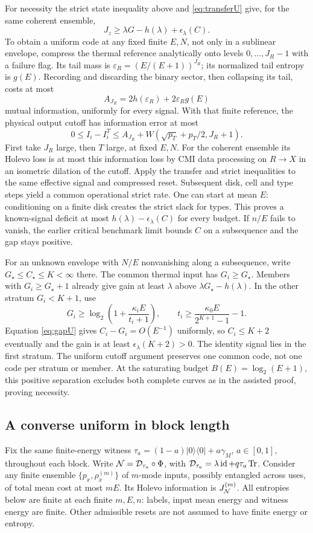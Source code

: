 \documentclass[11pt]{article}
\newcommand{\Tr}{\operatorname{Tr}}
\newcommand{\id}{\operatorname{id}}
\begin{document}
For necessity the strict state inequality above and
\eqref{eq:transferU} give, for the same coherent ensemble,
\[
 J_z\ge\lambda G-h(\lambda)+\epsilon_\lambda(C).
\]
To obtain a uniform code at any fixed finite \(E,N\), not only in a
sublinear envelope, compress the thermal reference analytically onto
levels \(0,\ldots,J_R-1\) with a failure flag. Its tail mass is
\(\varepsilon_R=(E/(E+1))^{J_R}\); its normalized tail entropy is \(g(E)\).
Recording and discarding the binary sector, then collapsing its tail,
costs at most
\[
 A_{J_R}=2h(\varepsilon_R)+2\varepsilon_Rg(E)
\]
mutual information, uniformly for every signal. With that finite
reference, the physical output cutoff has information error at most
\[
 0\le I_i-I_i^T
 \le A_{J_R}+W(\sqrt{p_T}+p_T/2,J_R+1).
\]
First take \(J_R\) large, then \(T\) large, at fixed \(E,N\).
For the coherent ensemble its Holevo loss is at most this information
loss by CMI data processing on \(R\to X\) in an isometric dilation of
the cutoff. Apply the transfer and strict inequalities to the same
effective signal and compressed reset. Subsequent disk, cell and type
steps yield a common operational strict rate. One can start at mean
\(E\): conditioning on a finite disk creates the strict slack for types.
This proves a known-signal deficit at most
\(h(\lambda)-\epsilon_\lambda(C)\) for every budget.
If \(n/E\) fails to vanish, the earlier critical benchmark limit bounds
\(C\) on a subsequence and the gap stays positive.

For an unknown envelope with \(N/E\) nonvanishing along a subsequence,
write \(G_\star\le C_\star\le K<\infty\) there. The common thermal input
has \(G_i\ge G_\star\). Members with \(G_i\ge G_\star+1\) already give
gain at least \(\lambda\) above \(\lambda G_\star-h(\lambda)\).
In the other stratum \(G_i<K+1\), use
\[
 G_i\ge\log_2\left(1+\frac{\kappa_iE}{t_i+1}\right),\qquad
 t_i\ge\frac{\kappa_0E}{2^{K+1}-1}-1 .
\]
Equation \eqref{eq:gapU} gives \(C_i-G_i=O(E^{-1})\) uniformly,
so \(C_i\le K+2\) eventually and the gain is at least
\(\epsilon_\lambda(K+2)>0\). The identity signal lies in the first
stratum. The uniform cutoff argument preserves one common code, not
one code per stratum or member. At the saturating budget
\(B(E)=\log_2(E+1)\), this positive separation excludes both complete
curves as in the assisted proof, proving necessity.

\subsection{A converse uniform in block length}
\label{sec:blockU}
Fix the same finite-energy witness
\(\tau_a=(1-a)|0\rangle\langle0|+a\gamma_M\), \(a\in[0,1]\),
throughout each block. Write
\({\cal N}={\cal D}_{\tau_a}\circ\Phi\), with
\({\cal D}_{\tau_a}=\lambda\id+q\tau_a\Tr\).
Consider any finite ensemble \(\{p_x,\rho_x^{(m)}\}\) of \(m\)-mode
inputs, possibly entangled across uses, of total mean cost at most \(mE\).
Its Holevo information is \(J_{\cal N}^{(m)}\).
All entropies below are finite at each finite \(m,E,n\): labels, input
mean energy and witness energy are finite. Other admissible resets
are not assumed to have finite energy or entropy.
\end{document}
